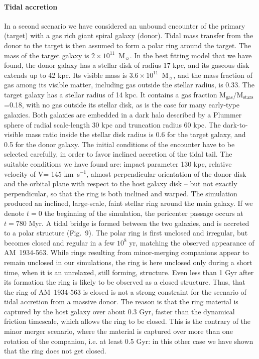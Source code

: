 \documentclass[]{aa}
\begin{document}
\paragraph{Tidal accretion}
In a second scenario we have considered an unbound encounter of the
primary (target) with a gas rich giant spiral galaxy (donor). Tidal mass
transfer from the donor to the target is then assumed to form a polar
ring around the target. The mass of the target galaxy is 
$2 \times 10^{11}$~M$_{\sun}$. In the best fitting model that we have found, 
the donor galaxy has a stellar disk of radius 17 kpc, and its gaseous disk
extends up to 42 kpc. Its visible mass is $3.6\times10^{11}$~M$_{\sun}$, and
the mass fraction of gas among its visible matter, including gas outside
the stellar radius, is 0.33. The target galaxy has a stellar radius of 14 kpc. 
It contains a gas fraction M$_{\mathrm{gas}}$/M$_{\mathrm{stars}}$=0.18, with no gas outside its 
stellar disk, as is the case for many early-type galaxies. Both galaxies 
are embedded in a
dark halo described by a Plummer sphere of radial scale-length 30 kpc and
truncation radius 60 kpc. The dark-to-visible mass ratio inside the
stellar disk radius is 0.6 for the target galaxy, and 0.5 for the donor
galaxy. The initial conditions of the encounter have to be 
selected carefully, in order to favor inclined accretion of the tidal 
tail. The suitable conditions we have found are: impact parameter 130 kpc, 
relative velocity of V= 145 km~s$^{-1}$, almost perpendicular orientation 
of the donor disk and the orbital plane with respect to the host 
galaxy disk -- but not exactly perpendicular, so that the ring is 
both inclined and warped. The simulation produced an inclined, large-scale, 
faint stellar ring around the main galaxy. If we denote $t=0$ the 
beginning of the simulation, the pericenter passage occurs at $t=780$ Myr. 
A tidal bridge is formed between the two galaxies, and is accreted to a 
polar structure (Fig.~9). The polar ring is first unclosed and irregular, 
but becomes closed and regular in a few $10^8$ yr, matching the 
observed appearance of AM~1934-563. While rings resulting from
minor-merging companions appear to remain unclosed in our simulations, the
ring is here unclosed only during a short time, when it is an unrelaxed,
still forming, structure. Even less than 1 Gyr after its formation the ring
is likely to be observed as a closed structure. Thus, that the ring of 
AM~1934-563 is closed is not a strong constraint for the scenario of 
tidal accretion from a massive donor. The reason is that the ring material 
is captured by the host galaxy over about 0.3 Gyr, faster than the dynamical 
friction timescale, which allows the ring to be closed. This is the contrary 
of the minor merger scenario, where the material is captured over more than 
one rotation of the companion, i.e. at least 0.5 Gyr: in this other case we 
have shown that the ring does not get closed.
\end{document}
